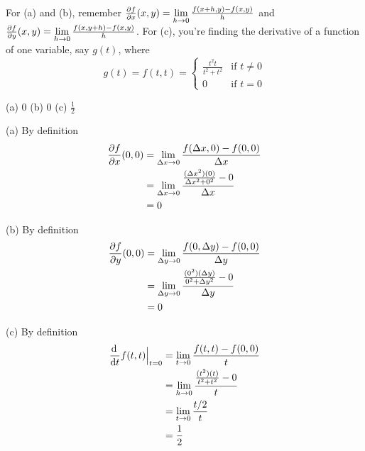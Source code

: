 \begin{hint}
For (a) and (b), remember $\pdiff{f}{x}(x,y)=\lim\limits_{h\to0}\frac{f(x+h,y)-f(x,y)}{h}$ and
$\pdiff{f}{y}(x,y)=\lim\limits_{h\to0}\frac{f(x,y+h)-f(x,y)}{h}$. For (c), you're finding the derivative of a function of one variable, say $g(t)$, where \begin{equation*}
g(t)=f(t,t)=\begin{cases}
                  \frac{t^2t}{t^2+t^2} & \text{if $t\ne 0$} \\
                  0                    & \text{if $t= 0$}
                 \end{cases}
\end{equation*}
\end{hint}

\begin{answer}
(a) $0$\qquad
(b) $0$\qquad
(c) $\frac{1}{2}$
\end{answer}

\begin{solution}
(a) By definition
\begin{align*}
\pdiff{f}{x}(0,0)
&=\lim_{\De x\rightarrow 0}\frac{f(\De x,0)-f(0,0)}{\De x} \\
&=\lim_{\De x\rightarrow 0}\frac{\frac{(\De x^2)(0)}{\De x^2+0^2}-0}{\De x} \\
&=0
\end{align*}

(b) By definition
\begin{align*}
\pdiff{f}{y}(0,0)
&=\lim_{\De y\rightarrow 0}\frac{f(0,\De y)-f(0,0)}{\De y} \\
&=\lim_{\De y\rightarrow 0}\frac{\frac{(0^2)(\De y)}{0^2+\De y^2}-0}{\De y} \\
&=0
\end{align*}

(c) By definition
\begin{align*}
\diff{}{t} f(t,t)\Big|_{t=0}
&=\lim_{t\rightarrow 0}\frac{f(t,t)-f(0,0)}{t} \\
&=\lim_{h\rightarrow 0}\frac{\frac{(t^2)(t)}{t^2+t^2}-0}{t} \\
&=\lim_{t\rightarrow 0}\frac{t/2}{t} \\
&=\frac{1}{2}
\end{align*}

\end{solution}



\subsection*{\Procedural}


